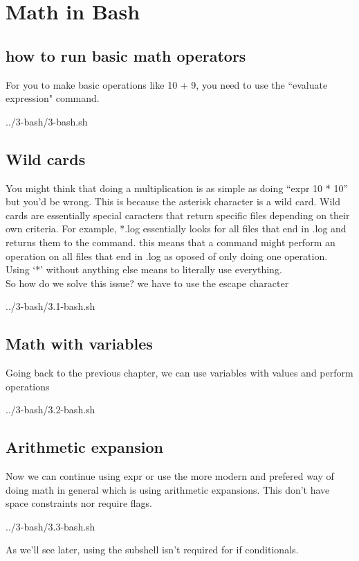 \chapter{Math in Bash}

\section{how to run basic math operators}

For you to make basic operations like 10 + 9, you need to use the ``evaluate expression" command.


{../3-bash/3-bash.sh}

\section{Wild cards}

You might think that doing a multiplication is as simple as doing ``expr 10 * 10'' but you'd
be wrong. This is because the asterisk character is a wild card. Wild cards are essentially
special caracters that return specific files depending on their own criteria.
For example, *.log essentially looks for all files that end in .log and returns them to the 
command. this means that a command might perform an operation on all files that end in .log
as oposed of only doing one operation. Using `*' without anything else means to literally use
everything.\\
So how do we solve this issue? we have to use the escape character


{../3-bash/3.1-bash.sh}


\section{Math with variables}

Going back to the previous chapter, we can use variables with values and perform operations


{../3-bash/3.2-bash.sh}
\pagebreak


\section{Arithmetic expansion}

Now we can continue using expr or use the more modern and prefered way of doing math in general
which is using arithmetic expansions. This don't have space constraints nor require flags.


{../3-bash/3.3-bash.sh}

As we'll see later, using the subshell isn't required for if conditionals.